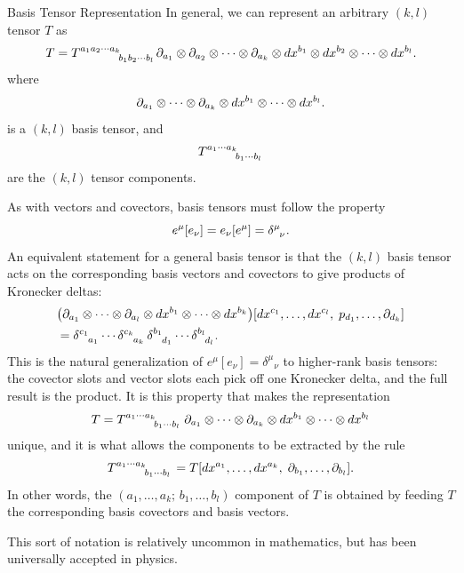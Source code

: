	\begin{definition}{Basis Tensor Representation}
		In general, we can represent an arbitrary $(k, l)$ tensor
		$T$ as
		\[
			T
			=
			\tensor{T}{^{a_1 a_2 \cdots a_k}_{b_1 b_2 \cdots b_l}}
			\p_{a_1} \otimes \p_{a_2} \otimes \cdots \otimes \p_{a_k}
			\otimes
			dx^{b_1} \otimes dx^{b_2} \otimes \cdots \otimes dx^{b_l}.
		\]
		where
		\[
			\partial_{a_1} \otimes \cdots \otimes \partial_{a_k}
			\otimes
			dx^{b_1} \otimes \cdots \otimes dx^{b_l}.
		\]
		is a $(k, l)$ basis tensor, and
		\[
			\tensor{T}{^{a_1 \cdots a_k}_{b_1 \cdots b_l}}
		\]
		are the $(k, l)$ tensor components.
	\end{definition}

	As with vectors and covectors, basis tensors must follow the
	property
	\[
		e^\mu[e_\nu] = e_\nu[e^\mu] = \tensor{\delta}{^\mu_\nu}.
	\]
	An equivalent statement for a general basis tensor is that the
	$(k, l)$ basis tensor acts on the corresponding basis vectors and
	covectors to give products of Kronecker deltas:
	\begin{align*}
		&\pqty{
			\p_{a_1} \otimes \cdots \otimes \p_{a_l}
		      \otimes 
			dx^{b_1} \otimes \cdots \otimes dx^{b_k}
		}
		\bqty{
			dx^{c_1}, \ldots, dx^{c_l}
			,\;
			p_{d_1}, \ldots, \p_{d_k}
		}\\
		&=
		\tensor{\delta}{^{c_1}_{a_1}} \cdots \tensor{\delta}{^{c_k}_{a_k}}\,
		\tensor{\delta}{^{b_1}_{d_1}} \cdots \tensor{\delta}{^{b_l}_{d_l}}.
	\end{align*}
	This is the natural generalization of $e^\mu[e_\nu] =
	\delta^\mu{}_\nu$ to higher-rank basis tensors: the covector
	slots and vector slots each pick off one Kronecker delta, and
	the full result is the product. It is this property that makes
	the representation
	\[
		T
		=
		\tensor{T}{^{a_1 \cdots a_k}_{b_1 \cdots b_l}}
		\,
		\p_{a_1} \otimes \cdots \otimes \p_{a_k}
		\otimes
		dx^{b_1} \otimes \cdots \otimes dx^{b_l}
	\]
	unique, and it is what allows the components to be extracted by
	the rule
	\[
		\tensor{T}{^{a_1 \cdots a_k}_{b_1 \cdots b_l}}
		=
		T\bqty{dx^{a_1}, \ldots, dx^{a_k},\;
		       \p_{b_1}, \ldots, \p_{b_l}}.
	\]
	In other words, the $(a_1, \ldots, a_k;\, b_1, \ldots, b_l)$ component
	of $T$ is obtained by feeding $T$ the corresponding basis
	covectors and basis vectors.
	
	This sort of notation is relatively uncommon in mathematics, but has been 
	universally accepted in physics.

